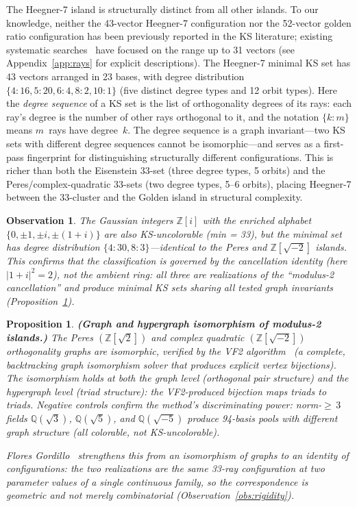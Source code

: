 \documentclass[12pt,a4paper]{article}
\newtheorem{proposition}[theorem]{Proposition}
\newtheorem{observation}[theorem]{Observation}
\newcommand{\Z}{\mathbb{Z}}
\newcommand{\Q}{\mathbb{Q}}
\begin{document}
The Heegner-7 island is structurally distinct from all other islands. To our knowledge, neither the 43-vector Heegner-7 configuration nor the 52-vector golden ratio configuration has been previously reported in the KS literature; existing systematic searches~\cite{Pavicic2004, LiBrightGanesh2024} have focused on the range up to 31 vectors (see Appendix~\ref{app:rays} for explicit descriptions). The Heegner-7 minimal KS set has 43 vectors arranged in 23 bases, with degree distribution $\{4{:}16, 5{:}20, 6{:}4, 8{:}2, 10{:}1\}$ (five distinct degree types and 12 orbit types). Here the \emph{degree sequence} of a KS set is the list of orthogonality degrees of its rays: each ray's degree is the number of other rays orthogonal to it, and the notation $\{k{:}m\}$ means $m$~rays have degree~$k$. The degree sequence is a graph invariant---two KS sets with different degree sequences cannot be isomorphic---and serves as a first-pass fingerprint for distinguishing structurally different configurations. This is richer than both the Eisenstein 33-set (three degree types, 5 orbits) and the Peres/complex-quadratic 33-sets (two degree types, 5--6 orbits), placing Heegner-7 between the 33-cluster and the Golden island in structural complexity.

\begin{observation}\label{obs:gaussian}
The Gaussian integers $\Z[i]$ with the enriched alphabet $\{0, \pm 1, \pm i, \pm(1+i)\}$ are also KS-uncolorable (min = 33), but the minimal set has degree distribution $\{4{:}30, 8{:}3\}$---identical to the Peres and $\Z[\sqrt{-2}]$ islands. This confirms that the classification is governed by the cancellation identity (here $|1+i|^2 = 2$), not the ambient ring: all three are realizations of the ``modulus-2 cancellation'' and produce minimal KS sets sharing all tested graph invariants (Proposition~\ref{prop:isomorphism}).
\end{observation}

\begin{proposition}\label{prop:isomorphism}
\textbf{(Graph and hypergraph isomorphism of modulus-2 islands.)} The Peres $(\Z[\sqrt{2}])$ and complex quadratic $(\Z[\sqrt{-2}])$ orthogonality graphs are isomorphic, verified by the VF2 algorithm~\cite{Cordella2004VF2} (a complete, backtracking graph isomorphism solver that produces explicit vertex bijections).  The isomorphism holds at both the graph level (orthogonal pair structure) and the hypergraph level (triad structure): the VF2-produced bijection maps triads to triads.  Negative controls confirm the method's discriminating power: norm-${\geq}\,3$ fields $\Q(\sqrt{3})$, $\Q(\sqrt{5})$, and $\Q(\sqrt{-5})$ produce 94-basis pools with different graph structure (all colorable, not KS-uncolorable).

Flores Gordillo~\cite{FloresGordillo2026} strengthens this from an isomorphism of graphs to an identity of configurations: the two realizations are the same 33-ray configuration at two parameter values of a single continuous family, so the correspondence is geometric and not merely combinatorial (Observation~\ref{obs:rigidity}).
\end{proposition}
\end{document}
